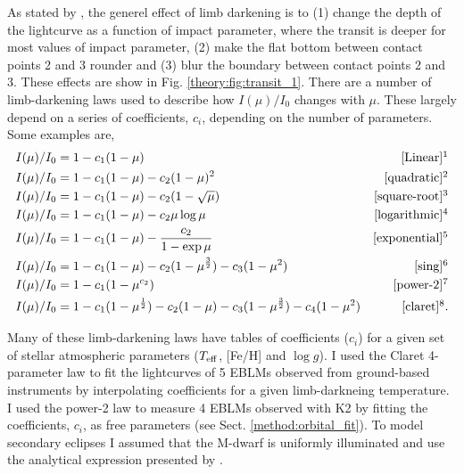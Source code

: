 As stated by \citet{2002astro.ph.10076S}, the generel effect of limb darkening is to (1) change the depth of the lightcurve as a function of impact parameter, where the transit is deeper for most values of impact parameter, (2) make the flat bottom between contact points 2 and 3 rounder and (3) blur the boundary between contact points 2 and 3. These effects are show in Fig. \ref{theory:fig:transit_1}. There are a number of limb-darkening laws used to describe how $I(\mu)/I_0$ changes with $\mu$. These largely depend on a series of coefficients, $c_i$, depending on the number of parameters. Some examples are,
%
\begin{eqnarray}
I(\mu)/I_0 & = 1 - c_1(1 - \mu) & \rm [Linear]\footnotemark\\
I(\mu)/I_0 & = 1-c_1(1-\mu) - c_2(1 - \mu)^2 & \rm [quadratic]\footnotemark \\
I(\mu)/I_0 & = 1 - c_1 (1 - \mu) - c_2 (1 - \sqrt{\mu}) & \rm [square \text{-} \rm root]\footnotemark \\
I(\mu)/I_0 & = 1 - c_1 (1 - \mu) - c_2 \mu \log \mu & \rm [logarithmic]\footnotemark \\
I(\mu)/I_0 & = 1 - c_1 ( 1 - \mu) - \frac{c_2}{1 - \exp{\mu}} & \rm [exponential]\footnotemark \\
I(\mu)/I_0 & = 1 - c_1 (1 - \mu) - c_2 ( 1 - \mu^{\frac{3}{2}}) - c_3 (1 - \mu^2) & \rm [sing]\footnotemark \\
I(\mu)/I_0 & = 1 - c_1 (1 - \mu^{c_2}) & \rm [power \text{-} \rm 2]\footnotemark \\
I(\mu)/I_0 & = 1 - c_1(1 - \mu^{\frac{1}{2}}) - c_2 (1 - \mu) - c_3 (1 - \mu^{\frac{3}{2}}) - c_4 (1 - \mu^2) & \rm [claret]\footnotemark .
\end{eqnarray}
%
\addtocounter{footnote}{-7}
%
Many of these limb-darkening laws have tables of coefficients ($c_i$) for a given set of stellar atmospheric parameters ($T_{\rm eff}$, [Fe/H] and $\log g$). I used the Claret 4-parameter law to fit the lightcurves of 5 EBLMs observed from ground-based instruments by interpolating coefficients for a given limb-darkneing temperature. I used the power-2 law to measure 4 EBLMs observed with K2 by fitting the coefficients, $c_i$, as free parameters (see Sect. \ref{method:orbital_fit}). To model secondary eclipses I assumed that the M-dwarf is uniformly illuminated and use the analytical expression presented by \citet{2015PASP..127.1161K}. 


